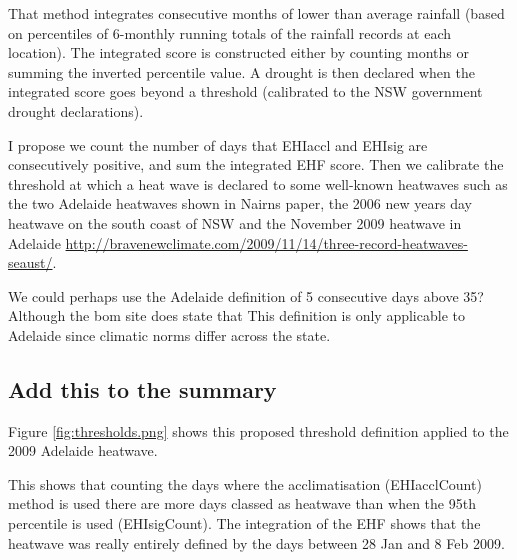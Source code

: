 \documentclass[a4paper]{article}
\begin{document}
 That method integrates consecutive months of lower than average rainfall (based on percentiles of 6-monthly running totals of the rainfall records at each location).  The integrated score is constructed either by counting months or summing the inverted percentile value.  A drought is then declared when the integrated score goes beyond a threshold (calibrated to the NSW government drought declarations).  
 
 I propose we count the number of days that EHIaccl and EHIsig are consecutively positive, and sum the integrated EHF score.  Then we calibrate the threshold at which a heat wave is declared to some well-known heatwaves such as the two Adelaide heatwaves shown in Nairns paper, the 2006 new years day heatwave on the south coast of NSW and the November 2009 heatwave in Adelaide \url{http://bravenewclimate.com/2009/11/14/three-record-heatwaves-seaust/}.
 
 We could perhaps use the Adelaide definition of 5 consecutive days above 35?  Although the bom site does state that This definition is only applicable to Adelaide since climatic norms differ across the state. 
 

\subsection{Add this to the summary}

Figure \ref{fig:thresholds.png} shows this proposed threshold definition applied to the 2009 Adelaide heatwave.
 
 This shows that counting the days where the acclimatisation (EHIacclCount) method is used there are more days classed as heatwave than when the 95th percentile is used (EHIsigCount).  The integration of the EHF shows that the heatwave was really entirely defined by the days between 28 Jan and 8 Feb 2009.
 
\end{document}
